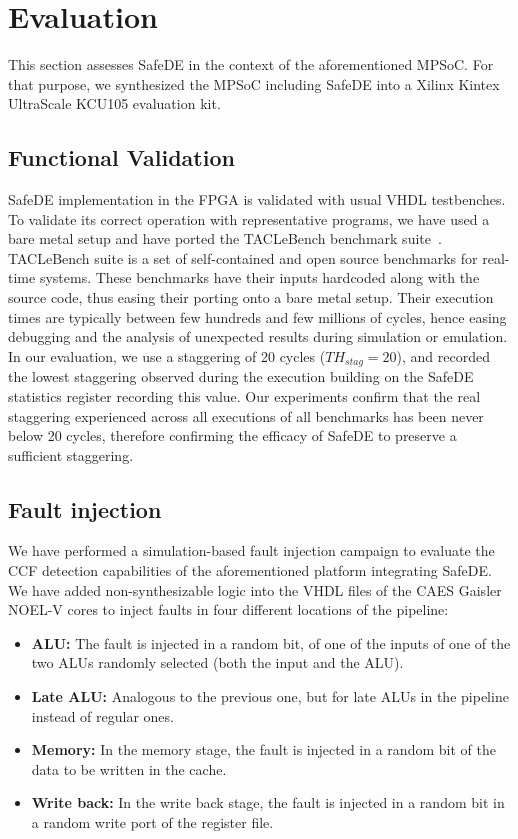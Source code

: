 
\section{Evaluation}
\label{sec:eval}

This section assesses SafeDE in the context of the aforementioned MPSoC. For that purpose, we synthesized the MPSoC including SafeDE into a Xilinx Kintex UltraScale KCU105 evaluation kit.

\subsection{Functional Validation}
SafeDE implementation in the FPGA is validated with usual VHDL testbenches. To validate its correct operation with representative programs, we have used a bare metal setup and have ported the TACLeBench benchmark suite~\cite{taclebench}. TACLeBench suite is a set of self-contained and open source benchmarks for real-time systems. These benchmarks have their inputs hardcoded along with the source code, thus easing their porting onto a bare metal setup. Their execution times are typically between few hundreds and few millions of cycles, hence easing debugging and the analysis of unexpected results during simulation or emulation. In our evaluation, we use a staggering of 20 cycles ($TH_{stag} = 20$), and recorded the lowest staggering observed during the execution building on the SafeDE statistics register recording this value. Our experiments confirm that the real staggering experienced across all executions of all benchmarks has been never below 20 cycles, therefore confirming the efficacy of SafeDE to preserve a sufficient staggering.

\subsection{Fault injection} 

We have performed a simulation-based fault injection campaign to evaluate the CCF detection capabilities of the aforementioned platform integrating SafeDE. 
We have added non-synthesizable logic into the VHDL files of the CAES Gaisler NOEL-V cores to inject faults in four different locations of the pipeline:

\begin{itemize}
\item \textbf{ALU:} The fault is injected in a random bit, of one of the inputs of one of the two ALUs randomly selected (both the input and the ALU). 
\item \textbf{Late ALU:} Analogous to the previous one, but for late ALUs in the pipeline instead of regular ones.
\item \textbf{Memory:} In the memory stage, the fault is injected in a random bit of the data to be written in the cache.
\item \textbf{Write back:} In the write back stage, the fault is injected in a random bit in a random write port of the register file.
\end{itemize}


